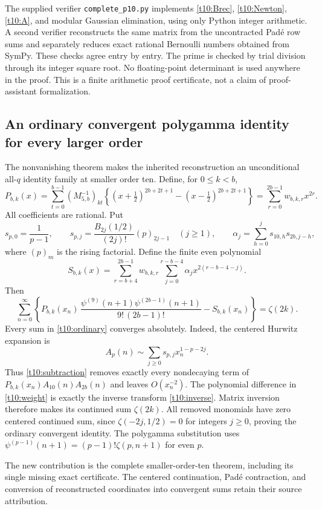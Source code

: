 The supplied verifier \texttt{complete\_p10.py} implements
\eqref{t10:Brec}, \eqref{t10:Newton}, \eqref{t10:A}, and modular
Gaussian elimination, using only Python integer arithmetic. A
second verifier reconstructs the same matrix from the uncontracted
Pad\'e row sums and separately reduces exact rational Bernoulli
numbers obtained from SymPy. These checks agree entry by entry.
The prime is checked by trial division through its integer square
root. No floating-point determinant is used anywhere in the proof.
This is a finite arithmetic proof certificate, not a claim of
proof-assistant formalization.

\subsection{An ordinary convergent polygamma identity for every larger order}

The nonvanishing theorem makes the inherited reconstruction an
unconditional all-$q$ identity family at smaller order ten. Define,
for $0\le k<b$,
\begin{equation}\label{t10:weight}
 P_{b,k}(x)=\sum_{t=0}^{b-1}(M_{5,b}^{-1})_{kt}
 \left\{(x+\tfrac12)^{2b+2t+1}-(x-\tfrac12)^{2b+2t+1}\right\}
 =\sum_{r=0}^{2b-1}w_{b,k,r}x^{2r}.
\end{equation}
All coefficients are rational. Put
\[
 s_{p,0}=\frac1{p-1},\qquad
 s_{p,j}=\frac{B_{2j}(1/2)}{(2j)!}(p)_{2j-1}\quad(j\ge1),
 \qquad
 \alpha_j=\sum_{h=0}^js_{10,h}s_{2b,j-h},
\]
where $(p)_m$ is the rising factorial. Define the finite even polynomial
\begin{equation}\label{t10:subtraction}
 S_{b,k}(x)=\sum_{r=b+4}^{2b-1}w_{b,k,r}
          \sum_{j=0}^{r-b-4}\alpha_jx^{2(r-b-4-j)}.
\end{equation}
Then
\begin{equation}\label{t10:ordinary}
 \boxed{\sum_{n=0}^{\infty}
 \left\{P_{b,k}(x_n)\,
 \frac{\psi^{(9)}(n+1)\psi^{(2b-1)}(n+1)}{9!\,(2b-1)!}
                -S_{b,k}(x_n)\right\}=\zeta(2k).}
\end{equation}
Every sum in \eqref{t10:ordinary} converges absolutely. Indeed,
the centered Hurwitz expansion is
\[
 A_p(n)\sim\sum_{j\ge0}s_{p,j}x_n^{1-p-2j}.
\]
Thus \eqref{t10:subtraction} removes exactly every nondecaying
term of $P_{b,k}(x_n)A_{10}(n)A_{2b}(n)$ and leaves $O(x_n^{-2})$.
The polynomial difference in \eqref{t10:weight} is exactly the
inverse transform \eqref{t10:inverse}. Matrix inversion therefore
makes its continued sum $\zeta(2k)$. All removed monomials have
zero centered continued sum, since
$\zeta(-2j,1/2)=0$ for integers $j\ge0$, proving the ordinary
convergent identity. The polygamma substitution uses
$\psi^{(p-1)}(n+1)=(p-1)!\zeta(p,n+1)$ for even $p$.

The new contribution is the complete smaller-order-ten theorem,
including its single missing exact certificate. The centered
continuation, Pad\'e contraction, and conversion of reconstructed
coordinates into convergent sums retain their source attribution.
